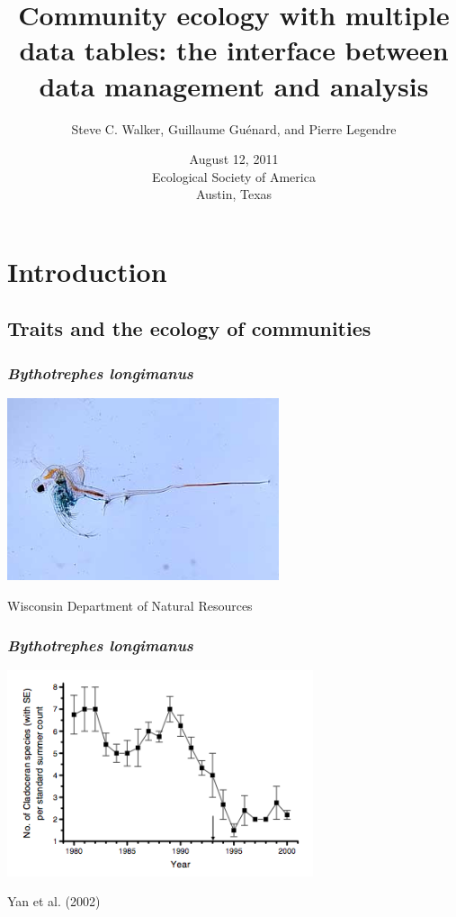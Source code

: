 \documentclass{beamer}
\title[The interface between data management and analysis]{Community ecology with multiple data tables:  the interface between data management and analysis}
\author[Steve C. Walker \\ Guillaume Gu\'{e}nard \\ Pierre Legendre]{Steve C. Walker, Guillaume Gu\'{e}nard, and Pierre Legendre}
\institute[Montr\'{e}al]{\insertlogo \\ D\'{e}partement de Sciences Biologiques}
\date[August 12, 2011]{August 12, 2011 \\ Ecological Society of America \\ Austin, Texas}
\numberwithin{exercise}{section}
\begin{document}
\maketitle

\section{Introduction}

\subsection[Traits and ecology]{Traits and the ecology of communities}

\begin{frame}
\frametitle{\textit{Bythotrephes longimanus}}
\begin{center}
\includegraphics[width=8cm]{waterflea}
\end{center}
\vspace{0.5cm}
\footnotesize{Wisconsin Department of Natural Resources}
\end{frame}

\begin{frame}
\frametitle{\textit{Bythotrephes longimanus}}
\begin{center}
\includegraphics[width=9cm]{Yan}
\end{center}
\vspace{0.5cm}
\footnotesize{Yan et al. (2002)}
\end{frame}
\end{document}
